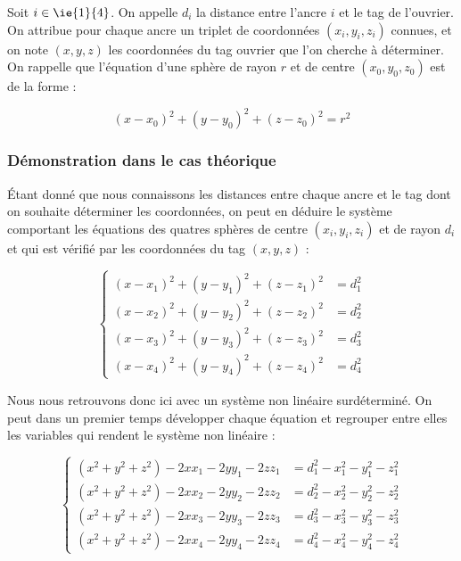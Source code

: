 \bigskip

Soit $i\in\ie{1}{4}$. On appelle $d_i$ la distance entre l'ancre $i$ et le tag de l'ouvrier. On attribue pour chaque ancre un triplet de coordonnées $(x_i, y_i, z_i)$ connues, et on note $(x, y, z)$ les coordonnées du tag ouvrier que l'on cherche à déterminer. On rappelle que l'équation d'une sphère de rayon $r$ et de centre $(x_0, y_0, z_0)$ est de la forme :

\begin{equation}
    (x-x_0)^2+(y-y_0)^2+(z-z_0)^2=r^2
\end{equation}

\subsubsection{Démonstration dans le cas théorique}

Étant donné que nous connaissons les distances entre chaque ancre et le tag dont on souhaite déterminer les coordonnées, on peut en déduire le système comportant les équations des quatres sphères de centre $(x_i, y_i, z_i)$ et de rayon $d_i$ et qui est vérifié par les coordonnées du tag $(x, y, z)$ :

\[
   \left\{
   \begin{aligned}
      (x-x_1)^2+(y-y_1)^2+(z-z_1)^2 &= d_1^2 \\
      (x-x_2)^2+(y-y_2)^2+(z-z_2)^2 &= d_2^2 \\
      (x-x_3)^2+(y-y_3)^2+(z-z_3)^2 &= d_3^2 \\
      (x-x_4)^2+(y-y_4)^2+(z-z_4)^2 &= d_4^2
   \end{aligned}
   \right.
\]

Nous nous retrouvons donc ici avec un système non linéaire surdéterminé. On peut dans un premier temps développer chaque équation et regrouper entre elles les variables qui rendent le système non linéaire :

\[
   \left\{
   \begin{aligned}
      (x^2 + y^2 + z^2) - 2xx_1 - 2yy_1 - 2zz_1 &= d_1^2 - x_1^2 - y_1^2 - z_1^2 \\
      (x^2 + y^2 + z^2) - 2xx_2 - 2yy_2 - 2zz_2 &= d_2^2 - x_2^2 - y_2^2 - z_2^2 \\
      (x^2 + y^2 + z^2) - 2xx_3 - 2yy_3 - 2zz_3 &= d_3^2 - x_3^2 - y_3^2 - z_3^2 \\
      (x^2 + y^2 + z^2) - 2xx_4 - 2yy_4 - 2zz_4 &= d_4^2 - x_4^2 - y_4^2 - z_4^2
   \end{aligned}
   \right.
\]

